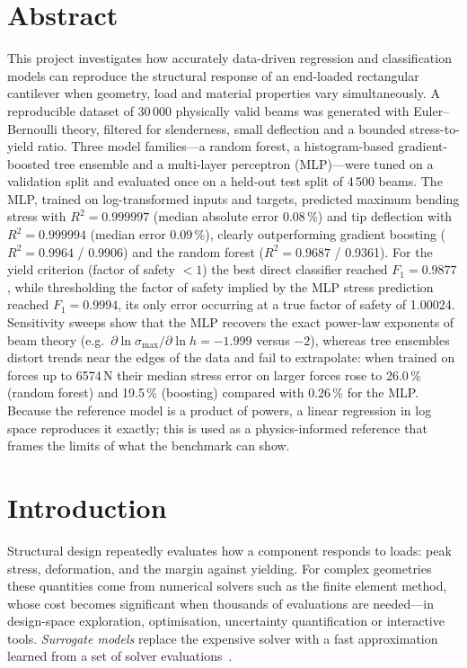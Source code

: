 \documentclass[11pt,a4paper]{article}
\newcommand{\smax}{\sigma_{\max}}
\begin{document}
\section*{Abstract}
This project investigates how accurately data-driven regression and classification models can reproduce the
structural response of an end-loaded rectangular cantilever when geometry, load and material properties vary
simultaneously. A reproducible dataset of 30\,000 physically valid beams was generated with Euler--Bernoulli theory,
filtered for slenderness, small deflection and a bounded stress-to-yield ratio. Three model families---a random
forest, a histogram-based gradient-boosted tree ensemble and a multi-layer perceptron (MLP)---were tuned on a
validation split and evaluated once on a held-out test split of 4\,500 beams. The MLP, trained on log-transformed
inputs and targets, predicted maximum bending stress with $R^2=0.999997$ (median absolute error
0.08\,\%) and tip deflection with $R^2=0.999994$ (median error 0.09\,\%), clearly
outperforming gradient boosting ($R^2=0.9964$ / 0.9906) and the random forest ($R^2=0.9687$ /
0.9361). For the yield criterion (factor of safety $<1$) the best direct classifier reached
$F_1=0.9877$, while thresholding the factor of safety implied by the MLP stress prediction reached
$F_1=0.9994$, its only error occurring at a true factor of safety of 1.00024. Sensitivity sweeps show that
the MLP recovers the exact power-law exponents of beam theory (e.g.\ $\partial\ln\smax/\partial\ln h=-1.999$
versus $-2$), whereas tree ensembles distort trends near the edges of the data and fail to extrapolate: when trained on
forces up to 6574\,N their median stress error on larger forces rose to 26.0\,\% (random forest) and
19.5\,\% (boosting) compared with 0.26\,\% for the MLP. Because the reference model is a product of powers, a
linear regression in log space reproduces it exactly; this is used as a physics-informed reference that frames the
limits of what the benchmark can show.

\section{Introduction}
Structural design repeatedly evaluates how a component responds to loads: peak stress, deformation, and the margin
against yielding. For complex geometries these quantities come from numerical solvers such as the finite element
method, whose cost becomes significant when thousands of evaluations are needed---in design-space exploration,
optimisation, uncertainty quantification or interactive tools. \emph{Surrogate models} replace the expensive solver with
a fast approximation learned from a set of solver evaluations~\cite{forrester2008}.
\end{document}
